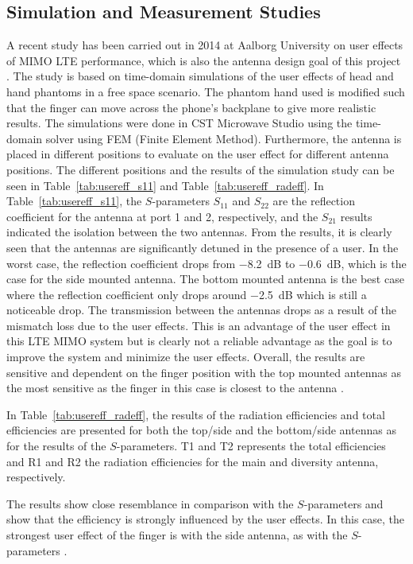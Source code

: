 \subsection{Simulation and Measurement Studies}
A recent study has been carried out in 2014 at Aalborg University on user effects of MIMO LTE performance, which is also the antenna design goal of this project \cite{Samantha2014UserEff}. The study is based on time-domain simulations of the user effects of head and hand phantoms in a free space scenario. The phantom hand used is modified such that the finger can move across the phone's backplane to give more realistic results. The simulations were done in CST Microwave Studio using the time-domain solver using FEM (Finite Element Method). Furthermore, the antenna is placed in different positions to evaluate on the user effect for different antenna positions. The different positions and the results of the simulation study can be seen in Table~\ref{tab:usereff_s11} and Table~\ref{tab:usereff_radeff}. In Table~\ref{tab:usereff_s11}, the $S$-parameters $S_{11}$ and $S_{22}$ are the reflection coefficient for the antenna at port 1 and 2, respectively, and the $S_{21}$ results indicated the isolation between the two antennas. From the results, it is clearly seen that the antennas are significantly detuned in the presence of a user. In the worst case, the reflection coefficient drops from \SI{-8.2}{dB} to \SI{-0.6}{dB}, which is the case for the side mounted antenna. The bottom mounted antenna is the best case where the reflection coefficient only drops around \SI{-2.5}{dB} which is still a noticeable drop. The transmission between the antennas drops as a result of the mismatch loss due to the user effects. This is an advantage of the user effect in this LTE MIMO system but is clearly not a reliable advantage as the goal is to improve the system and minimize the user effects. Overall, the results are sensitive and dependent on the finger position with the top mounted antennas as the most sensitive as the finger in this case is closest to the antenna \cite{Samantha2014UserEff}.

In Table~\ref{tab:usereff_radeff}, the results of the radiation efficiencies and total efficiencies are presented for both the top/side and the bottom/side antennas as for the results of the $S$-parameters. T1 and T2 represents the total efficiencies and R1 and R2 the radiation efficiencies for the main and diversity antenna, respectively. 

The results show close resemblance in comparison with the $S$-parameters and show that the efficiency is strongly influenced by the user effects. In this case, the strongest user effect of the finger is with the side antenna, as with the $S$-parameters \cite{Samantha2014UserEff}.

